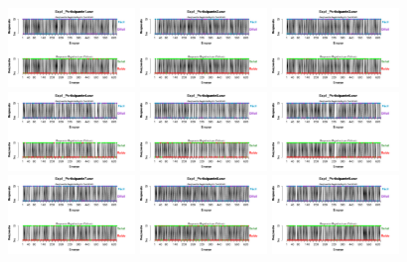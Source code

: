 \begin{figure}[th]
\centering
\includegraphics[width=0.30\textwidth]{Figures/BiasResp_Exp1_P1} \includegraphics[width=0.30\textwidth]{Figures/BiasResp_Exp1_P2} \includegraphics[width=0.30\textwidth]{Figures/BiasResp_Exp1_P3}
\includegraphics[width=0.30\textwidth]{Figures/BiasResp_Exp1_P4} \includegraphics[width=0.30\textwidth]{Figures/BiasResp_Exp1_P5} \includegraphics[width=0.30\textwidth]{Figures/BiasResp_Exp1_P6}
\includegraphics[width=0.30\textwidth]{Figures/BiasResp_Exp1_P7} \includegraphics[width=0.30\textwidth]{Figures/BiasResp_Exp1_P8} \includegraphics[width=0.30\textwidth]{Figures/BiasResp_Exp1_P9}

\end{figure}
